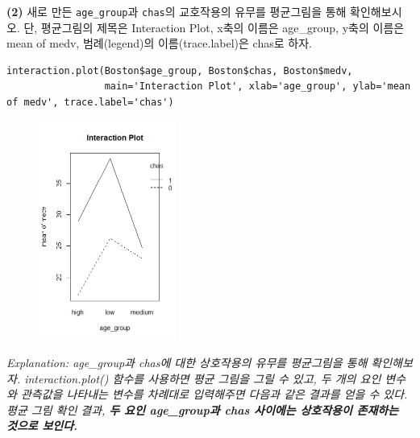 \documentclass{article}
\begin{document}
\textbf{(2)} 새로 만든 \texttt{age\_group}과 \texttt{chas}의 교호작용의 유무를 평균그림을 통해 확인해보시오. 단, 평균그림의 제목은 Interaction Plot, x축의 이름은 age\_group, y축의 이름은 mean of medv, 범례(legend)의 이름(trace.label)은 chas로 하자. 
\begin{lstlisting}[style={r-style}]
interaction.plot(Boston$age_group, Boston$chas, Boston$medv,
                 main='Interaction Plot', xlab='age_group', ylab='mean of medv', trace.label='chas')

\end{lstlisting}
\begin{figure}[htb!]
    \centering
    \includegraphics[width=0.4\textwidth]{fig/ex6-2.png}
\end{figure}
\emph{Explanation: age\_group과 chas에 대한 상호작용의 유무를 평균그림을 통해 확인해보자. interaction.plot() 함수를 사용하면 평균 그림을 그릴 수 있고, 두 개의 요인
변수와 관측값을 나타내는 변수를 차례대로 입력해주면 다음과 같은 결과를 얻을 수 있다. 평균 그림 확인 결과, \textbf{두 요인 age\_group과 chas 사이에는 상호작용이 존재하는 것으로 보인다.} } \\
\end{document}
